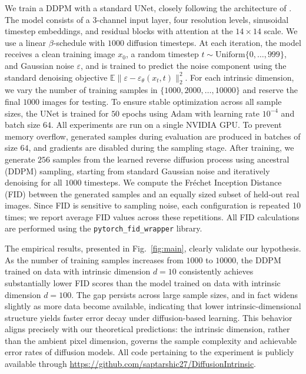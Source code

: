 \documentclass[12pts]{article}
\begin{document}
We train a DDPM with a standard UNet, closely following the architecture of 
\citet{ho2020denoising}. The model consists of a 3-channel input layer, four resolution 
levels, sinusoidal timestep embeddings, and residual blocks with attention at the 
$14\times14$ scale. We use a linear $\beta$-schedule with $1000$ diffusion timesteps. 
At each iteration, the model receives a clean training image $x_0$, a random timestep 
$t \sim \mathrm{Uniform}\{0,\dots,999\}$, and Gaussian noise $\varepsilon$, and is trained 
to predict the noise component using the standard denoising objective 
$\mathbb{E}\| \varepsilon - \varepsilon_\theta(x_t,t)\|_2^2$. For each intrinsic dimension, we vary the number of training samples in 
$\{1000, 2000, \ldots, 10000\}$ and reserve the final $1000$ images for testing. 
To ensure stable optimization across all sample sizes, the UNet is trained for 
$50$ epochs using Adam with learning rate $10^{-4}$ and batch size $64$. 
All experiments are run on a single NVIDIA GPU. To prevent memory overflow, generated 
samples during evaluation are produced in batches of size $64$, and gradients are 
disabled during the sampling stage.
After training, we generate $256$ samples from the learned reverse diffusion process 
using ancestral (DDPM) sampling, starting from standard Gaussian noise and iteratively 
denoising for all $1000$ timesteps. We compute the Fréchet Inception Distance (FID) 
\citep{heusel2017gans} between the generated samples and an equally sized subset of 
held-out real images. Since FID is sensitive to sampling noise, each configuration is 
repeated 10 times; we report average FID values across these repetitions. All FID 
calculations are performed using the \texttt{pytorch\_fid\_wrapper} library.

The empirical results, presented in Fig.~\ref{fig:main}, clearly validate our 
hypothesis. As the number of training samples increases from $1000$ to $10000$, the 
DDPM trained on data with intrinsic dimension $d = 10$ consistently achieves 
substantially lower FID scores than the model trained on data with intrinsic dimension 
$d = 100$. The gap persists across large sample sizes, and in fact widens slightly as 
more data become available, indicating that lower intrinsic-dimensional structure 
yields faster error decay under diffusion-based learning. This behavior aligns precisely 
with our theoretical predictions: the intrinsic dimension, rather than the ambient pixel 
dimension, governs the sample complexity and achievable error rates of diffusion models. All code pertaining to the experiment is publicly available through \url{https://github.com/saptarshic27/DiffusionIntrinsic}.
\end{document}
